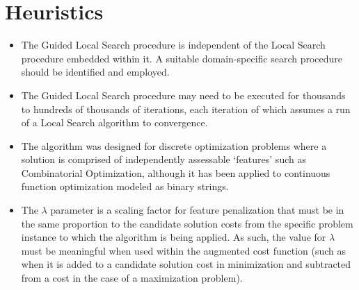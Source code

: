 \documentclass[a4paper, 11pt]{article}
\begin{document}
\section{Heuristics}
\label{sec:heuristics}

\begin{itemize}
	\item The Guided Local Search procedure is independent of the Local Search procedure embedded within it. A suitable domain-specific search procedure should be identified and employed.
	\item The Guided Local Search procedure may need to be executed for thousands to hundreds of thousands of iterations, each iteration of which assumes a run of a Local Search algorithm to convergence.
	\item The algorithm was designed for discrete optimization problems where a solution is comprised of independently assessable `features' such as Combinatorial Optimization, although it has been applied to continuous function optimization modeled as binary strings.
	\item The $\lambda$ parameter is a scaling factor for feature penalization that must be in the same proportion to the candidate solution costs from the specific problem instance to which the algorithm is being applied. As such, the value for $\lambda$ must be meaningful when used within the augmented cost function (such as when it is added to a candidate solution cost in minimization and subtracted from a cost in the case of a maximization problem).
\end{itemize}

\end{document}
